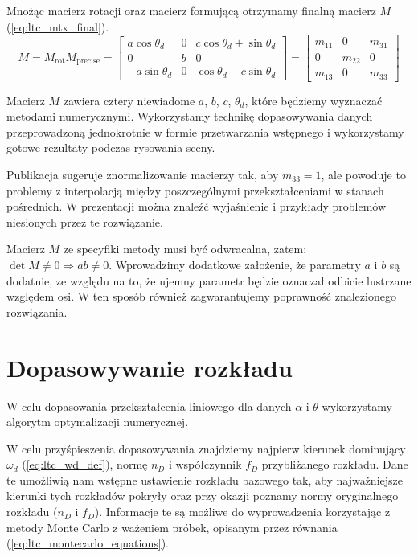 \documentclass[../main.tex]{subfiles}
\begin{document}
Mnożąc macierz rotacji oraz macierz formującą otrzymamy finalną macierz $M$  (\ref{eq:ltc_mtx_final}).
\begin{equation}
M = M_{\text{rot}} M_{\text{precise}} = \begin{bmatrix}
a\cos\theta_d & 0 & c\cos\theta_d + \sin\theta_d \\
0 & b & 0 \\
-a\sin\theta_d & 0 & \cos\theta_d - c \sin\theta_d
\end{bmatrix} = \begin{bmatrix}
m_{11} & 0 & m_{31} \\
0 & m_{22} & 0 \\
m_{13} & 0 & m_{33}
\end{bmatrix}
\label{eq:ltc_mtx_final}
\end{equation}

Macierz $M$ zawiera cztery niewiadome $a$, $b$, $c$, $\theta_d$, które będziemy wyznaczać metodami numerycznymi. Wykorzystamy technikę dopasowywania danych przeprowadzoną jednokrotnie w formie przetwarzania wstępnego i wykorzystamy gotowe rezultaty podczas rysowania sceny.

Publikacja \cite{ltc_heitz} sugeruje znormalizowanie macierzy tak, aby $m_{33}=1$, ale powoduje to problemy z interpolacją między poszczególnymi przekształceniami w stanach pośrednich. W prezentacji \cite{LTCJourneyPresentation} można znaleźć wyjaśnienie i przykłady problemów niesionych przez te rozwiązanie.

Macierz $M$ ze specyfiki metody musi być odwracalna, zatem: $\det M \neq 0 \Rightarrow ab \neq 0$. Wprowadzimy dodatkowe założenie, że parametry $a$ i $b$ są dodatnie, ze względu na to, że ujemny parametr będzie oznaczał odbicie lustrzane względem osi. W ten sposób również zagwarantujemy poprawność znalezionego rozwiązania.

\section{Dopasowywanie rozkładu}

W celu dopasowania przekształcenia liniowego dla danych $\alpha$ i $\theta$ wykorzystamy algorytm optymalizacji numerycznej.

W celu przyśpieszenia dopasowywania znajdziemy najpierw kierunek dominujący $\omega_d$ (\ref{eq:ltc_wd_def}), normę $n_D$ i współczynnik $f_D$ przybliżanego rozkładu. Dane te umożliwią nam wstępne ustawienie rozkładu bazowego tak, aby najważniejsze kierunki tych rozkładów pokryły oraz przy okazji poznamy normy oryginalnego rozkładu ($n_D$ i $f_D$). Informacje te są możliwe do wyprowadzenia korzystając z metody Monte Carlo z ważeniem próbek, opisanym przez równania (\ref{eq:ltc_montecarlo_equations}).
    
\end{document}
